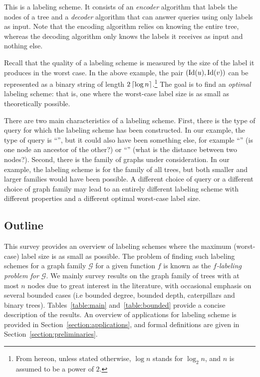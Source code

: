 This is a labeling scheme. It consists of an \emph{encoder} algorithm that labels the nodes of a tree and a \emph{decoder} algorithm that can answer \adjacency queries using only labels as input. Note that the encoding algorithm relies on knowing the entire tree, whereas the decoding algorithm only knows the labels it receives as input and nothing else. 

Recall that the quality of a labeling scheme is measured by the size of the label it produces in the worst case.
In the above example, the pair $(\operatorname{Id}(u),\operatorname{Id}(v))$ can be represented as a binary string of length $2\left\lceil{\log n}\right\rceil$.\footnote{From hereon, unless stated otherwise,  $\log n$ stands for $ \log_{2} n$, and $n$ is assumed to be a power of $2$.}
The  goal is to find an \emph{optimal} labeling scheme: that is, one where the worst-case label size is as small as theoretically possible.

There are two main characteristics of a labeling scheme. First, there is the type of query for which the labeling scheme has been constructed. In our example, the type of query is ``\adjacency'', but it could also have been something else, for example ``\ancestry'' (is one node an ancestor of the other?) or ``\distance'' (what is the distance between  two nodes?). Second, there is the family of graphs under consideration. In our example, the labeling scheme is for the family of all trees, but both smaller and larger families would have been possible. A different choice of query or a different choice of graph family may lead to an entirely different labeling scheme with different properties and a different optimal worst-case label size. 

\subsection{Outline}
This survey provides an overview of labeling schemes where the maximum (worst-case) label size is as small as possible.
The problem of finding such labeling schemes for a graph family $\mathcal{G}$  for a given function $f$ is known as the \emph{$f$-labeling problem for $\mathcal{G}$}.
We mainly survey results on  the graph family of trees with at most $n$ nodes due to great interest in the literature, with occasional emphasis on several bounded cases (i.e bounded degree, bounded depth, caterpillars and binary trees).
Tables~\ref{table:main} and~\ref{table:bounded}  provide a concise description of the results.
An overview of applications for labeling scheme is provided in Section~\ref{section:applications}, and formal definitions are given in Section~\ref{section:preliminaries}.

